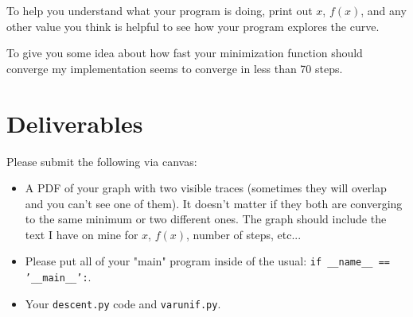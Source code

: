 \begin{fullwidth}
To help you understand what your program is doing, print out $x$, $f(x)$, and any other value you think is helpful to see how your program explores the curve.

To give you some idea about  how fast your minimization function should converge my implementation seems to converge in less than 70 steps.
 
\section{Deliverables}

Please submit the following via canvas:
 
\begin{itemize}
\item A PDF of your graph with two visible traces (sometimes they will overlap and you can't see one of them).  It doesn't matter if they both are converging to the same minimum or two different ones. The graph should include the text I have on mine for $x$, $f(x)$, number of steps, etc...
\item Please put all of your "main" program inside of the usual: {\tt if \_\_name\_\_ == '\_\_main\_\_':}.
\item Your {\tt descent.py} code and {\tt varunif.py}.
\end{itemize}

\end{fullwidth}

